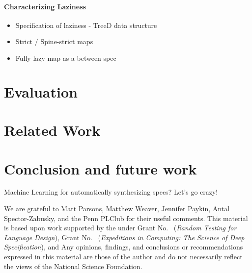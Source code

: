 \documentclass[acmsmall,review]{acmart}\settopmatter{}
\begin{document}

\paragraph*{Characterizing Laziness}

\begin{itemize}
\item Specification of laziness - TreeD data structure 
\item Strict / Spine-strict maps
\item Fully lazy map as a between spec
\end{itemize}

\section{Evaluation}
\label{sec:eval}

\section{Related Work}
\label{sec:related}


\section{Conclusion and future work}
\label{sec:concl}

Machine Learning for automatically synthesizing specs? Let's go crazy!

\begin{acks}                            %
We are grateful to
%
Matt Parsons,
Matthew Weaver,
Jennifer Paykin,
Antal Spector-Zabusky,
and the Penn PLClub 
for their useful comments. 
This material is based upon work supported by the
 under Grant
No.~ ({\em Random Testing for Language
Design}), Grant No.~ ({\em Expeditions
in Computing: The Science of Deep Specification}), and  Any opinions, findings, and
conclusions or recommendations expressed in this material are those of
the author and do not necessarily reflect the views of the National
Science Foundation.

\end{acks}

%



% 
\end{document}
